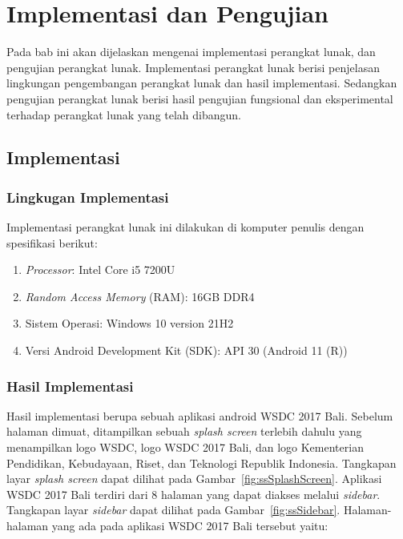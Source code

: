 \chapter{Implementasi dan Pengujian}
\label{chap:implementasipengujian}

Pada bab ini akan dijelaskan mengenai implementasi perangkat lunak, dan pengujian perangkat lunak. Implementasi perangkat lunak berisi penjelasan lingkungan pengembangan perangkat lunak dan hasil implementasi. Sedangkan pengujian perangkat lunak berisi hasil pengujian fungsional dan eksperimental terhadap perangkat lunak yang telah dibangun.

\section{Implementasi} 
\label{sec:implementasi}

\subsection{Lingkugan Implementasi}
\label{subsec:lingkunganimplementasi}

Implementasi perangkat lunak ini dilakukan di komputer penulis dengan spesifikasi berikut:
\begin{enumerate}
	\item \textit{Processor}: Intel Core i5 7200U
	\item \textit{Random Access Memory} (RAM): 16GB DDR4
	\item Sistem Operasi: Windows 10 version 21H2
	\item Versi Android Development Kit (SDK): API 30 (Android 11 (R))
\end{enumerate}

\subsection{Hasil Implementasi}
\label{subsec:hasilimplementasi}

Hasil implementasi berupa sebuah aplikasi android WSDC 2017 Bali. Sebelum halaman dimuat, ditampilkan sebuah \textit{splash screen} terlebih dahulu yang menampilkan logo WSDC, logo WSDC 2017 Bali, dan logo Kementerian Pendidikan, Kebudayaan, Riset, dan Teknologi Republik Indonesia. Tangkapan layar \textit{splash screen} dapat dilihat pada Gambar~\ref{fig:ssSplashScreen}. Aplikasi WSDC 2017 Bali terdiri dari 8 halaman yang dapat diakses melalui \textit{sidebar}. Tangkapan layar \textit{sidebar} dapat dilihat pada Gambar~\ref{fig:ssSidebar}. Halaman-halaman yang ada pada aplikasi WSDC 2017 Bali tersebut yaitu:

